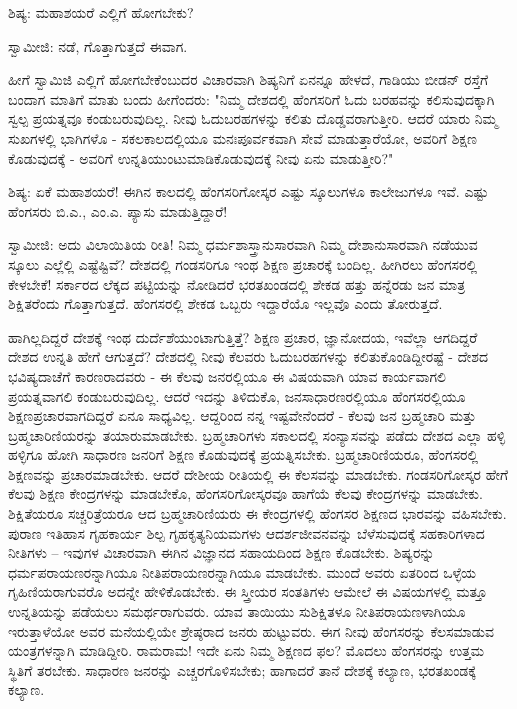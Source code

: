 ಶಿಷ್ಯ: ಮಹಾಶಯರೆ ಎಲ್ಲಿಗೆ ಹೋಗಬೇಕು?

ಸ್ವಾಮೀಜಿ: ನಡೆ, ಗೊತ್ತಾಗುತ್ತದೆ ಈವಾಗ.

ಹೀಗೆ ಸ್ವಾಮಿಜಿ ಎಲ್ಲಿಗೆ ಹೋಗಬೇಕೆಂಬುದರ ವಿಚಾರವಾಗಿ ಶಿಷ್ಯನಿಗೆ ಏನನ್ನೂ ಹೇಳದೆ, ಗಾಡಿಯು ಬೀಡನ್ ರಸ್ತೆಗೆ ಬಂದಾಗ ಮಾತಿಗೆ ಮಾತು ಬಂದು ಹೀಗೆಂದರು: "ನಿಮ್ಮ ದೇಶದಲ್ಲಿ ಹೆಂಗಸರಿಗೆ ಓದು ಬರಹವನ್ನು ಕಲಿಸುವುದಕ್ಕಾಗಿ ಸ್ವಲ್ಪ ಪ್ರಯತ್ನವೂ ಕಂಡುಬರುವುದಿಲ್ಲ. ನೀವು ಓದುಬರಹಗಳನ್ನು ಕಲಿತು ದೊಡ್ಡವರಾಗುತ್ತೀರಿ. ಆದರೆ ಯಾರು ನಿಮ್ಮ ಸುಖಗಳಲ್ಲಿ ಭಾಗಿಗಳೊ - ಸಕಲಕಾಲದಲ್ಲಿಯೂ ಮನಃಪೂರ್ವಕವಾಗಿ ಸೇವೆ ಮಾಡುತ್ತಾರೆಯೋ, ಅವರಿಗೆ ಶಿಕ್ಷಣ ಕೊಡುವುದಕ್ಕೆ - ಅವರಿಗೆ ಉನ್ನತಿಯುಂಟುಮಾಡಿಕೊಡುವುದಕ್ಕೆ ನೀವು ಏನು ಮಾಡುತ್ತೀರಿ?"

ಶಿಷ್ಯ: ಏಕೆ ಮಹಾಶಯರೆ! ಈಗಿನ ಕಾಲದಲ್ಲಿ ಹೆಂಗಸರಿಗೋಸ್ಕರ ಎಷ್ಟು ಸ್ಕೂಲುಗಳೂ ಕಾಲೇಜುಗಳೂ ಇವೆ. ಎಷ್ಟು ಹೆಂಗಸರು ಬಿ.ಎ., ಎಂ.ಎ. ಪ್ಯಾಸು ಮಾಡುತ್ತಿದ್ದಾರೆ!

ಸ್ವಾಮೀಜಿ: ಅದು ವಿಲಾಯಿತಿಯ ರೀತಿ! ನಿಮ್ಮ ಧರ್ಮಶಾಸ್ತ್ರಾನುಸಾರವಾಗಿ ನಿಮ್ಮ ದೇಶಾನುಸಾರವಾಗಿ ನಡೆಯುವ ಸ್ಕೂಲು ಎಲ್ಲೆಲ್ಲಿ ಎಷ್ಟೆಷ್ಟಿವೆ? ದೇಶದಲ್ಲಿ ಗಂಡಸರಿಗೂ ಇಂಥ ಶಿಕ್ಷಣ ಪ್ರಚಾರಕ್ಕೆ ಬಂದಿಲ್ಲ. ಹೀಗಿರಲು ಹೆಂಗಸರಲ್ಲಿ ಕೇಳಬೇಕೆ! ಸರ್ಕಾರದ ಲೆಕ್ಕದ ಪಟ್ಟಿಯನ್ನು ನೋಡಿದರೆ ಭರತಖಂಡದಲ್ಲಿ ಶೇಕಡ ಹತ್ತು ಹನ್ನೆರಡು ಜನ ಮಾತ್ರ ಶಿಕ್ಷಿತರೆಂದು ಗೊತ್ತಾಗುತ್ತದೆ. ಹೆಂಗಸರಲ್ಲಿ ಶೇಕಡ ಒಬ್ಬರು ಇದ್ದಾರೆಯೊ ಇಲ್ಲವೊ ಎಂದು ತೋರುತ್ತದೆ.

ಹಾಗಿಲ್ಲದಿದ್ದರೆ ದೇಶಕ್ಕೆ ಇಂಥ ದುರ್ದೆಶೆಯುಂಟಾಗುತ್ತಿತ್ತೆ? ಶಿಕ್ಷಣ ಪ್ರಚಾರ, ಜ್ಞಾನೋದಯ, ಇವೆಲ್ಲಾ ಆಗದಿದ್ದರೆ ದೇಶದ ಉನ್ನತಿ ಹೇಗೆ ಆಗುತ್ತದೆ? ದೇಶದಲ್ಲಿ ನೀವು ಕೆಲವರು ಓದುಬರಹಗಳನ್ನು ಕಲಿತುಕೊಂಡಿದ್ದೀರಷ್ಟೆ - ದೇಶದ ಭವಿಷ್ಯದಾಚೆಗೆ ಕಾರಣರಾದವರು - ಈ ಕೆಲವು ಜನರಲ್ಲಿಯೂ ಈ ವಿಷಯವಾಗಿ ಯಾವ ಕಾರ್ಯವಾಗಲಿ ಪ್ರಯತ್ನವಾಗಲಿ ಕಂಡುಬರುವುದಿಲ್ಲ. ಆದರೆ ಇದನ್ನು ತಿಳಿದುಕೊ, ಜನಸಾಧಾರಣರಲ್ಲಿಯೂ ಹೆಂಗಸರಲ್ಲಿಯೂ ಶಿಕ್ಷಣಪ್ರಚಾರವಾಗದಿದ್ದರೆ ಏನೂ ಸಾಧ್ಯವಿಲ್ಲ. ಆದ್ದರಿಂದ ನನ್ನ ಇಷ್ಟವೇನೆಂದರೆ - ಕೆಲವು ಜನ ಬ್ರಹ್ಮಚಾರಿ ಮತ್ತು ಬ್ರಹ್ಮಚಾರಿಣಿಯರನ್ನು ತಯಾರುಮಾಡಬೇಕು. ಬ್ರಹ್ಮಚಾರಿಗಳು ಸಕಾಲದಲ್ಲಿ ಸಂನ್ಯಾಸವನ್ನು ಪಡೆದು ದೇಶದ ಎಲ್ಲಾ ಹಳ್ಳಿ ಹಳ್ಳಿಗೂ ಹೋಗಿ ಸಾಧಾರಣ ಜನರಿಗೆ ಶಿಕ್ಷಣ ಕೊಡುವುದಕ್ಕೆ ಪ್ರಯತ್ನಿಸಬೇಕು. ಬ್ರಹ್ಮಚಾರಿಣಿಯರೂ, ಹೆಂಗಸರಲ್ಲಿ ಶಿಕ್ಷಣವನ್ನು ಪ್ರಚಾರಮಾಡಬೇಕು. ಆದರೆ ದೇಶೀಯ ರೀತಿಯಲ್ಲಿ ಈ ಕೆಲಸವನ್ನು ಮಾಡಬೇಕು. ಗಂಡಸರಿಗೋಸ್ಕರ ಹೇಗೆ ಕೆಲವು ಶಿಕ್ಷಣ ಕೇಂದ್ರಗಳನ್ನು ಮಾಡಬೇಕೊ, ಹೆಂಗಸರಿಗೋಸ್ಕರವೂ ಹಾಗೆಯೆ ಕೆಲವು ಕೇಂದ್ರಗಳನ್ನು ಮಾಡಬೇಕು. ಶಿಕ್ಷಿತೆಯರೂ ಸಚ್ಚರಿತ್ರೆಯರೂ ಆದ ಬ್ರಹ್ಮಚಾರಿಣಿಯರು ಈ ಕೇಂದ್ರಗಳಲ್ಲಿ ಹೆಂಗಸರ ಶಿಕ್ಷಣದ ಭಾರವನ್ನು ವಹಿಸಬೇಕು. ಪುರಾಣ ಇತಿಹಾಸ ಗೃಹಕಾರ್ಯ ಶಿಲ್ಪ ಗೃಹಕೃತ್ಯನಿಯಮಗಳು ಆದರ್ಶಜೀವನವನ್ನು ಬೆಳೆಸುವುದಕ್ಕೆ ಸಹಕಾರಿಗಳಾದ ನೀತಿಗಳು – ಇವುಗಳ ವಿಚಾರವಾಗಿ ಈಗಿನ ವಿಜ್ಞಾನದ ಸಹಾಯದಿಂದ ಶಿಕ್ಷಣ ಕೊಡಬೇಕು. ಶಿಷ್ಯರನ್ನು ಧರ್ಮಪರಾಯಣರನ್ನಾಗಿಯೂ ನೀತಿಪರಾಯಣರನ್ನಾಗಿಯೂ ಮಾಡಬೇಕು. ಮುಂದೆ ಅವರು ಏತರಿಂದ ಒಳ್ಳೆಯ ಗೃಹಿಣಿಯರಾಗುವರೊ ಅದನ್ನೇ ಹೇಳಿಕೊಡಬೇಕು. ಈ ಸ್ತ್ರೀಯರ ಸಂತತಿಗಳು ಆಮೇಲೆ ಈ ವಿಷಯಗಳಲ್ಲಿ ಮತ್ತೂ ಉನ್ನತಿಯನ್ನು ಪಡೆಯಲು ಸಮರ್ಥರಾಗುವರು. ಯಾವ ತಾಯಿಯು ಸುಶಿಕ್ಷಿತಳೂ ನೀತಿಪರಾಯಣಳಾಗಿಯೂ ಇರುತ್ತಾಳೆಯೋ ಅವರ ಮನೆಯಲ್ಲಿಯೇ ಶ್ರೇಷ್ಠರಾದ ಜನರು ಹುಟ್ಟುವರು. ಈಗ ನೀವು ಹೆಂಗಸರನ್ನು ಕೆಲಸಮಾಡುವ ಯಂತ್ರಗಳನ್ನಾಗಿ ಮಾಡಿದ್ದೀರಿ. ರಾಮರಾಮ! ಇದೇ ಏನು ನಿಮ್ಮ ಶಿಕ್ಷಣದ ಫಲ? ಮೊದಲು ಹೆಂಗಸರನ್ನು ಉತ್ತಮ ಸ್ಥಿತಿಗೆ ತರಬೇಕು. ಸಾಧಾರಣ ಜನರನ್ನು ಎಚ್ಚರಗೊಳಿಸಬೇಕು; ಹಾಗಾದರೆ ತಾನೆ ದೇಶಕ್ಕೆ ಕಲ್ಯಾಣ, ಭರತಖಂಡಕ್ಕೆ ಕಲ್ಯಾಣ.

